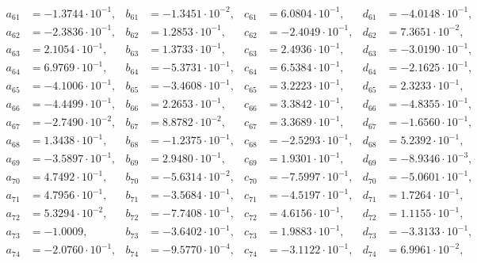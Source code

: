 \begin{align*}
  a_{ 61 } &= -1.3744 \cdot 10^{ -1 }, & b_{ 61 } &= -1.3451 \cdot 10^{ -2 }, & c_{ 61 } &= 6.0804 \cdot 10^{ -1 }, & d_{ 61 } &= -4.0148 \cdot 10^{ -1 }, \\ 
  a_{ 62 } &= -2.3836 \cdot 10^{ -1 }, & b_{ 62 } &= 1.2853 \cdot 10^{ -1 }, & c_{ 62 } &= -2.4049 \cdot 10^{ -1 }, & d_{ 62 } &= 7.3651 \cdot 10^{ -2 }, \\ 
  a_{ 63 } &= 2.1054 \cdot 10^{ -1 }, & b_{ 63 } &= 1.3733 \cdot 10^{ -1 }, & c_{ 63 } &= 2.4936 \cdot 10^{ -1 }, & d_{ 63 } &= -3.0190 \cdot 10^{ -1 }, \\ 
  a_{ 64 } &= 6.9769 \cdot 10^{ -1 }, & b_{ 64 } &= -5.3731 \cdot 10^{ -1 }, & c_{ 64 } &= 6.5384 \cdot 10^{ -1 }, & d_{ 64 } &= -2.1625 \cdot 10^{ -1 }, \\ 
  a_{ 65 } &= -4.1006 \cdot 10^{ -1 }, & b_{ 65 } &= -3.4608 \cdot 10^{ -1 }, & c_{ 65 } &= 3.2223 \cdot 10^{ -1 }, & d_{ 65 } &= 2.3233 \cdot 10^{ -1 }, \\ 
  a_{ 66 } &= -4.4499 \cdot 10^{ -1 }, & b_{ 66 } &= 2.2653 \cdot 10^{ -1 }, & c_{ 66 } &= 3.3842 \cdot 10^{ -1 }, & d_{ 66 } &= -4.8355 \cdot 10^{ -1 }, \\ 
  a_{ 67 } &= -2.7490 \cdot 10^{ -2 }, & b_{ 67 } &= 8.8782 \cdot 10^{ -2 }, & c_{ 67 } &= 3.3689 \cdot 10^{ -1 }, & d_{ 67 } &= -1.6560 \cdot 10^{ -1 }, \\ 
  a_{ 68 } &= 1.3438 \cdot 10^{ -1 }, & b_{ 68 } &= -1.2375 \cdot 10^{ -1 }, & c_{ 68 } &= -2.5293 \cdot 10^{ -1 }, & d_{ 68 } &= 5.2392 \cdot 10^{ -1 }, \\ 
  a_{ 69 } &= -3.5897 \cdot 10^{ -1 }, & b_{ 69 } &= 2.9480 \cdot 10^{ -1 }, & c_{ 69 } &= 1.9301 \cdot 10^{ -1 }, & d_{ 69 } &= -8.9346 \cdot 10^{ -3 }, \\ 
  a_{ 70 } &= 4.7492 \cdot 10^{ -1 }, & b_{ 70 } &= -5.6314 \cdot 10^{ -2 }, & c_{ 70 } &= -7.5997 \cdot 10^{ -1 }, & d_{ 70 } &= -5.0601 \cdot 10^{ -1 }, \\ 
  a_{ 71 } &= 4.7956 \cdot 10^{ -1 }, & b_{ 71 } &= -3.5684 \cdot 10^{ -1 }, & c_{ 71 } &= -4.5197 \cdot 10^{ -1 }, & d_{ 71 } &= 1.7264 \cdot 10^{ -1 }, \\ 
  a_{ 72 } &= 5.3294 \cdot 10^{ -2 }, & b_{ 72 } &= -7.7408 \cdot 10^{ -1 }, & c_{ 72 } &= 4.6156 \cdot 10^{ -1 }, & d_{ 72 } &= 1.1155 \cdot 10^{ -1 }, \\ 
  a_{ 73 } &= -1.0009, & b_{ 73 } &= -3.6402 \cdot 10^{ -1 }, & c_{ 73 } &= 1.9883 \cdot 10^{ -1 }, & d_{ 73 } &= -3.3133 \cdot 10^{ -1 }, \\ 
  a_{ 74 } &= -2.0760 \cdot 10^{ -1 }, & b_{ 74 } &= -9.5770 \cdot 10^{ -4 }, & c_{ 74 } &= -3.1122 \cdot 10^{ -1 }, & d_{ 74 } &= 6.9961 \cdot 10^{ -2 }, \\ 

\end{align*}
